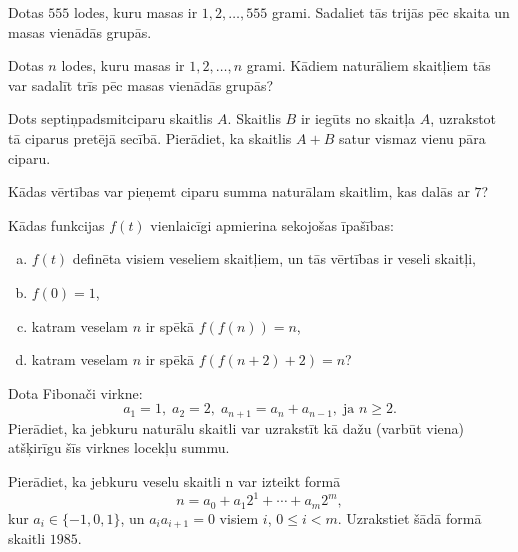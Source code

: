 \documentclass[a4paper,12pt]{article}
\begin{document}
\vspace{10pt}
\begin{problem}
Dotas $555$ lodes, kuru masas ir $1, 2, \ldots, 555$ grami. Sadaliet tās trijās pēc skaita un masas vienādās grupās.
\end{problem}

\vspace{10pt}
\begin{problem}
Dotas $n$ lodes, kuru masas ir $1, 2, \ldots, n$ grami. Kādiem naturāliem skaitļiem tās var sadalīt trīs pēc masas vienādās grupās?
\end{problem}

\vspace{10pt}
\begin{problem}
Dots septiņpadsmitciparu skaitlis $A$. Skaitlis $B$ ir iegūts no skaitļa $A$, uzrakstot tā ciparus pretējā secībā. 
Pierādiet, ka skaitlis $A+B$ satur vismaz vienu pāra ciparu.
\end{problem}

\vspace{10pt}
\begin{problem}
Kādas vērtības var pieņemt ciparu summa naturālam skaitlim, kas dalās ar $7$?
\end{problem}

\vspace{10pt}
\begin{problem}
Kādas funkcijas $f(t)$ vienlaicīgi apmierina sekojošas īpašības:
\begin{enumerate}[(a)]
\item $f(t)$ definēta visiem veseliem skaitļiem, un tās vērtības ir veseli skaitļi,
\item $f(0)=1$,
\item katram veselam $n$ ir spēkā $f(f(n))=n$,
\item katram veselam $n$ ir spēkā $f(f(n+2)+2) = n$?
\end{enumerate}
\end{problem}


\vspace{10pt}
\begin{problem}
Dota Fibonači virkne:
$$a_1 = 1,\;a_2 = 2,\;a_{n+1}=a_n + a_{n-1},\;\mbox{ja $n \geq 2$}.$$
Pierādiet, ka jebkuru naturālu skaitli var uzrakstīt kā dažu (varbūt viena) atšķirīgu šīs virknes locekļu summu.
\end{problem}


\vspace{10pt}
\begin{problem}
Pierādiet, ka jebkuru veselu skaitli n var izteikt formā
$$n = a_0 + a_1 2^1 + \cdots  + a_m2^m,$$
kur $a_i \in \{ -1,0,1\}$, un $a_ia_{i+1} = 0$ visiem $i$, $0 \leq i < m$.
Uzrakstiet šādā formā skaitli $1985$.
\end{problem}
\end{document}

